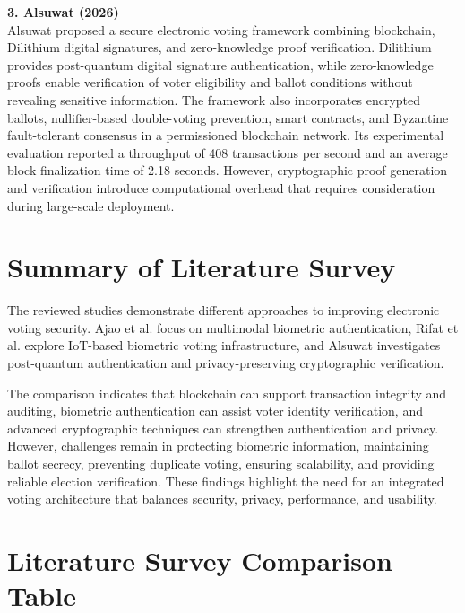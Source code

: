 \documentclass[12pt]{report}
\begin{document}
	\vspace{0.3cm}
	\noindent\textbf{3. Alsuwat (2026)}\\
	Alsuwat proposed a secure electronic voting framework combining blockchain, Dilithium digital signatures, and zero-knowledge proof verification. Dilithium provides post-quantum digital signature authentication, while zero-knowledge proofs enable verification of voter eligibility and ballot conditions without revealing sensitive information. The framework also incorporates encrypted ballots, nullifier-based double-voting prevention, smart contracts, and Byzantine fault-tolerant consensus in a permissioned blockchain network. Its experimental evaluation reported a throughput of 408 transactions per second and an average block finalization time of 2.18 seconds. However, cryptographic proof generation and verification introduce computational overhead that requires consideration during large-scale deployment.
	
	\section{Summary of Literature Survey}
	The reviewed studies demonstrate different approaches to improving electronic voting security. Ajao et al. focus on multimodal biometric authentication, Rifat et al. explore IoT-based biometric voting infrastructure, and Alsuwat investigates post-quantum authentication and privacy-preserving cryptographic verification.
	
	The comparison indicates that blockchain can support transaction integrity and auditing, biometric authentication can assist voter identity verification, and advanced cryptographic techniques can strengthen authentication and privacy. However, challenges remain in protecting biometric information, maintaining ballot secrecy, preventing duplicate voting, ensuring scalability, and providing reliable election verification. These findings highlight the need for an integrated voting architecture that balances security, privacy, performance, and usability.
	
	\newpage
	\section{Literature Survey Comparison Table}
	
\end{document}
